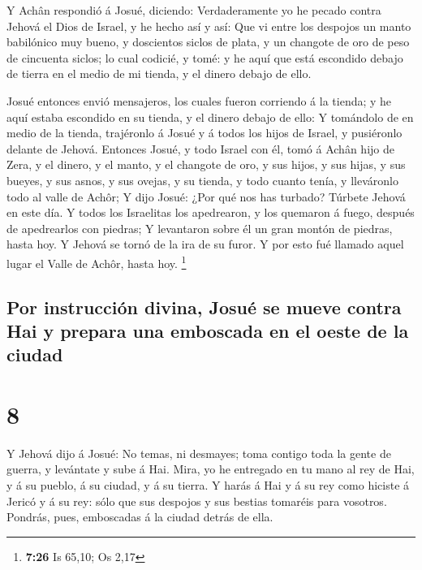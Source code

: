  Y Achân respondió á Josué, diciendo: Verdaderamente yo
he pecado contra Jehová el Dios de Israel, y he hecho así y así:
 Que vi entre los despojos un manto babilónico muy bueno,
y doscientos siclos de plata, y un changote de oro de peso de cincuenta
siclos; lo cual codicié, y tomé: y he aquí que está escondido debajo de
tierra en el medio de mi tienda, y el dinero debajo de ello.

 Josué entonces envió mensajeros, los cuales fueron
corriendo á la tienda; y he aquí estaba escondido en su tienda, y el
dinero debajo de ello:  Y tomándolo de en medio de la
tienda, trajéronlo á Josué y á todos los hijos de Israel, y pusiéronlo
delante de Jehová.  Entonces Josué, y todo Israel con él,
tomó á Achân hijo de Zera, y el dinero, y el manto, y el changote de
oro, y sus hijos, y sus hijas, y sus bueyes, y sus asnos, y sus ovejas,
y su tienda, y todo cuanto tenía, y lleváronlo todo al valle de Achôr;
 Y dijo Josué: ¿Por qué nos has turbado? Túrbete Jehová
en este día. Y todos los Israelitas los apedrearon, y los quemaron á
fuego, después de apedrearlos con piedras;  Y levantaron
sobre él un gran montón de piedras, hasta hoy. Y Jehová se tornó de la
ira de su furor. Y por esto fué llamado aquel lugar el Valle de Achôr,
hasta hoy. \footnote{\textbf{7:26} Is 65,10; Os 2,17}

\hypertarget{por-instrucciuxf3n-divina-josuuxe9-se-mueve-contra-hai-y-prepara-una-emboscada-en-el-oeste-de-la-ciudad}{%
\subsection{Por instrucción divina, Josué se mueve contra Hai y prepara
una emboscada en el oeste de la
ciudad}\label{por-instrucciuxf3n-divina-josuuxe9-se-mueve-contra-hai-y-prepara-una-emboscada-en-el-oeste-de-la-ciudad}}

\hypertarget{section-7}{%
\section{8}\label{section-7}}

 Y Jehová dijo á Josué: No temas, ni desmayes; toma
contigo toda la gente de guerra, y levántate y sube á Hai. Mira, yo he
entregado en tu mano al rey de Hai, y á su pueblo, á su ciudad, y á su
tierra.  Y harás á Hai y á su rey como hiciste á Jericó y
á su rey: sólo que sus despojos y sus bestias tomaréis para vosotros.
Pondrás, pues, emboscadas á la ciudad detrás de ella.


